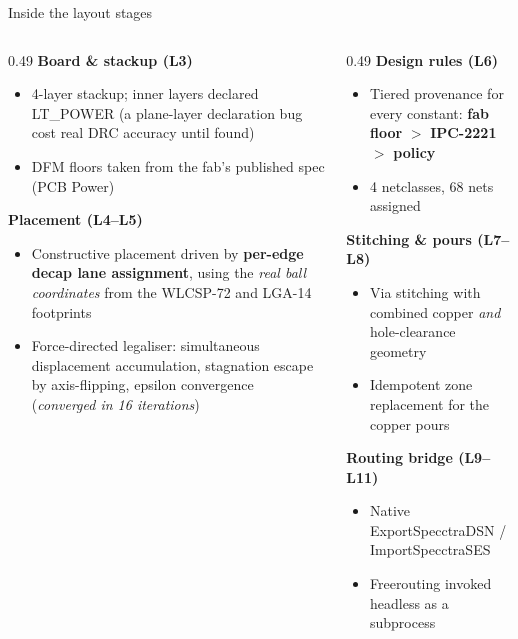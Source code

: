 \documentclass[aspectratio=169,10pt]{beamer}
\newcommand{\code}[1]{{\ttfamily\small #1}}
\begin{document}
\begin{frame}{Inside the layout stages}
\vspace{1mm}
\begin{columns}[T]
\begin{column}{0.49\textwidth}
\small
\textbf{Board \& stackup (L3)}
\begin{itemize}\footnotesize
  \item 4-layer stackup; inner layers declared \code{LT\_POWER} (a plane-layer declaration bug cost real DRC accuracy until found)
  \item DFM floors taken from the fab's published spec (PCB Power)
\end{itemize}
\textbf{Placement (L4--L5)}
\begin{itemize}\footnotesize
  \item Constructive placement driven by \textbf{per-edge decap lane assignment}, using the \emph{real ball coordinates} from the WLCSP-72 and LGA-14 footprints
  \item Force-directed legaliser: simultaneous displacement accumulation, stagnation escape by axis-flipping, epsilon convergence \\ ({\itshape converged in 16 iterations})
\end{itemize}
\end{column}
\begin{column}{0.49\textwidth}
\small
\textbf{Design rules (L6)}
\begin{itemize}\footnotesize
  \item Tiered provenance for every constant: \textbf{fab floor} $>$ \textbf{IPC-2221} $>$ \textbf{policy}
  \item 4 netclasses, 68 nets assigned
\end{itemize}
\textbf{Stitching \& pours (L7--L8)}
\begin{itemize}\footnotesize
  \item Via stitching with combined copper \emph{and} hole-clearance geometry
  \item Idempotent zone replacement for the copper pours
\end{itemize}
\textbf{Routing bridge (L9--L11)}
\begin{itemize}\footnotesize
  \item Native \code{ExportSpecctraDSN} / \code{ImportSpecctraSES}
  \item Freerouting invoked headless as a subprocess
\end{itemize}
\end{column}
\end{columns}
\end{frame}
\end{document}
